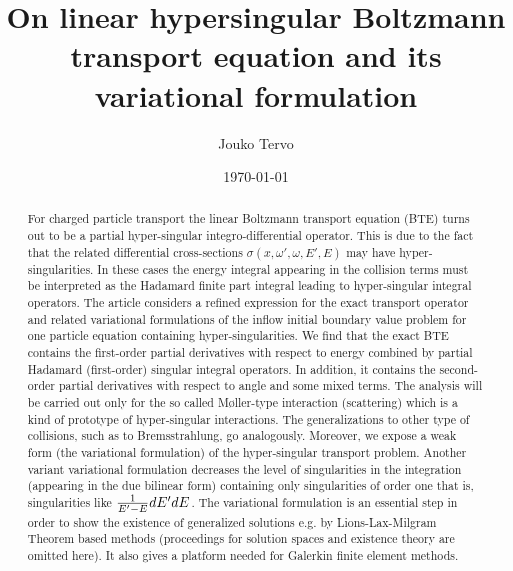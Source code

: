 \documentclass[a4paper,12pt,oneside,reqno]{amsart}
\theoremstyle{theorem}
\begin{document}
\title[On  linear hypersingular BTE and its variational formulation]{On linear hypersingular Boltzmann transport equation and its variational formulation }


 
\author{Jouko Tervo}
\address{University of Eastern Finland, Department of Applied Physics, P.O.Box 1627, 70211 Kuopio, Finland}
 
\date{\today}

\maketitle

 


 
\begin{abstract}

For charged particle transport the linear Boltzmann transport equation (BTE) turns out to be a partial hyper-singular  integro-differential operator. 
This is due to the fact that
the related differential cross-sections $\sigma(x,\omega',\omega,E',E)$
may have hyper-singularities. In these cases the energy integral appearing in the collision terms  must be interpreted as the  Hadamard finite part integral leading to hyper-singular integral operators.
The article considers a refined expression for the exact transport operator and related variational formulations of the inflow initial boundary value problem for one particle equation  containing hyper-singularities. 
We find that the exact BTE contains the first-order partial derivatives with respect to energy combined by partial Hadamard (first-order) singular integral operators. In addition, it contains the second-order partial derivatives with respect to angle and some mixed terms.
The analysis will be carried out only for the so called M\o ller-type interaction (scattering) which is a kind of prototype of hyper-singular interactions. The generalizations to other type of collisions, such as to Bremsstrahlung, go analogously.
Moreover, we expose a weak form (the variational formulation) of the hyper-singular transport problem. 
Another variant variational formulation 
decreases the level of singularities in the integration (appearing in the due bilinear form) containing only singularities of order one that is, singularities like ${1\over{E'-E}}dE' dE$.
The variational formulation is an essential step in order to show the existence of generalized solutions e.g. by Lions-Lax-Milgram Theorem based methods (proceedings for solution spaces and existence theory are omitted here). It also gives a platform needed for Galerkin finite element methods. 
\end{abstract}
\end{document}
